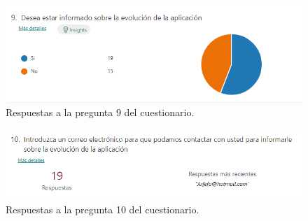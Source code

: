 \begin{figure}[h]
\centering\includegraphics[width=1\linewidth]{figs/cuestionario_9.png}
\caption{Respuestas a la pregunta 9 del cuestionario.}
\label{Fig:cuestionario_9}
\end{figure}

\begin{figure}[h]
\centering\includegraphics[width=1\linewidth]{figs/cuestionario_10.png}
\caption{Respuestas a la pregunta 10 del cuestionario.}
\label{Fig:cuestionario_10}
\end{figure}